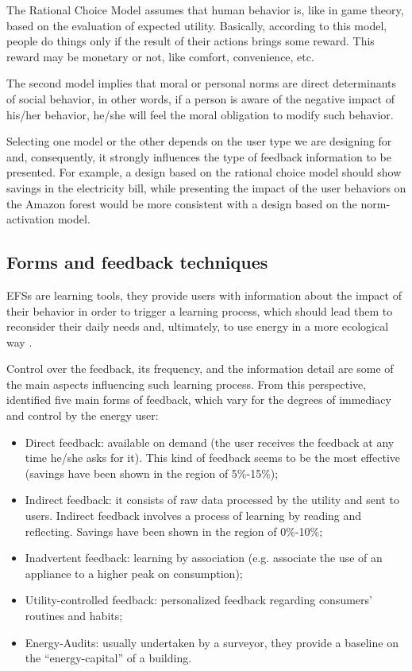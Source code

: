 The Rational Choice Model assumes that human behavior is, like in game theory, based on the evaluation of expected utility. Basically, according to this model, people do things only if the result of their actions brings some reward. This reward may be monetary or not, like comfort, convenience, etc.


The second model implies that moral or personal norms are direct determinants of social behavior, in other words, if a person is aware of the negative impact of his/her behavior, he/she will feel the moral obligation to modify such behavior.


Selecting one model or the other depends on the user type we are designing for and, consequently, it strongly influences the type of feedback information to be presented. For example, a design based on the rational choice model should show savings in the electricity bill, while presenting the impact of the user behaviors on the Amazon forest would be more consistent with a design based on the norm-activation model.

\subsection{Forms and feedback techniques}

\acp{EFS} are learning tools, they provide users with information about the impact of their behavior in order to trigger a learning process, which should lead them to reconsider their daily needs and, ultimately, to use energy in a more ecological way \cite{DesigningFeedback}.


Control over the feedback, its frequency, and the information detail are some of the main aspects influencing such learning process. From this perspective, \cite{Darby2006, DesigningFeedback} identified five main forms of feedback, which vary for the degrees of immediacy and control by the energy user:

\begin{itemize}
    \item Direct feedback: available on demand (the user receives the feedback at any time he/she asks for it). This kind of feedback seems to be the most effective (savings have been shown in the region of 5\%-15\%);
    \item Indirect feedback: it consists of raw data processed by the utility and sent to users. Indirect feedback involves a process of learning by reading and reflecting. Savings have been shown in the region of 0\%-10\%;
    \item Inadvertent feedback: learning by association (e.g. associate the use of an appliance to a higher peak on consumption);
    \item Utility-controlled feedback: personalized feedback regarding consumers’ routines and habits;
    \item  Energy-Audits: usually undertaken by a surveyor, they provide a baseline on the “energy-capital” of a building.
\end{itemize}


